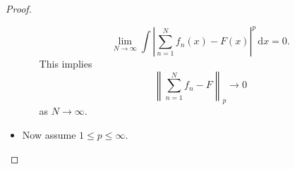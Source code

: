 \begin{proof}
\begin{itemize}
\begin{enumerate}
\begin{explanation}
				            \[
					            \lim\limits_{N \to \infty} \int \left\vert \sum\limits_{n=1}^{N} f_{n} (x)- F(x) \right\vert ^p \,\mathrm{d} x = 0.
				            \]
				            This implies
				            \[
					            \left\lVert \sum\limits_{n=1}^{N} f_{n} - F\right\rVert _p \to 0
				            \]
				            as \(N\to \infty \).
			            \end{explanation}
		      \end{enumerate}
		\item Now assume \(1\leq p\leq \infty \). 
	\end{itemize}
\end{proof}